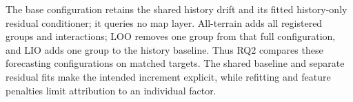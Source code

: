 The base configuration retains the shared history drift and its fitted
history-only residual conditioner; it queries no map layer. All-terrain adds all registered
groups and interactions; LOO removes one group from that full configuration,
and LIO adds one group to the history baseline. Thus RQ2 compares these
forecasting configurations on matched targets. The shared baseline and
separate residual fits make the intended increment explicit, while
refitting and feature penalties limit attribution to an individual factor.
